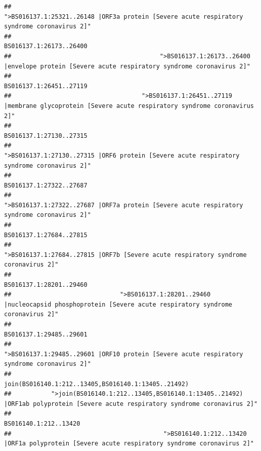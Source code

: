 \documentclass[
]{article}
\begin{document}
\begin{verbatim}
##                                            ">BS016137.1:25321..26148 |ORF3a protein [Severe acute respiratory syndrome coronavirus 2]" 
##                                                                                                                BS016137.1:26173..26400 
##                                         ">BS016137.1:26173..26400 |envelope protein [Severe acute respiratory syndrome coronavirus 2]" 
##                                                                                                                BS016137.1:26451..27119 
##                                    ">BS016137.1:26451..27119 |membrane glycoprotein [Severe acute respiratory syndrome coronavirus 2]" 
##                                                                                                                BS016137.1:27130..27315 
##                                             ">BS016137.1:27130..27315 |ORF6 protein [Severe acute respiratory syndrome coronavirus 2]" 
##                                                                                                                BS016137.1:27322..27687 
##                                            ">BS016137.1:27322..27687 |ORF7a protein [Severe acute respiratory syndrome coronavirus 2]" 
##                                                                                                                BS016137.1:27684..27815 
##                                                    ">BS016137.1:27684..27815 |ORF7b [Severe acute respiratory syndrome coronavirus 2]" 
##                                                                                                                BS016137.1:28201..29460 
##                              ">BS016137.1:28201..29460 |nucleocapsid phosphoprotein [Severe acute respiratory syndrome coronavirus 2]" 
##                                                                                                                BS016137.1:29485..29601 
##                                            ">BS016137.1:29485..29601 |ORF10 protein [Severe acute respiratory syndrome coronavirus 2]" 
##                                                                                    join(BS016140.1:212..13405,BS016140.1:13405..21492) 
##           ">join(BS016140.1:212..13405,BS016140.1:13405..21492) |ORF1ab polyprotein [Severe acute respiratory syndrome coronavirus 2]" 
##                                                                                                                  BS016140.1:212..13420 
##                                          ">BS016140.1:212..13420 |ORF1a polyprotein [Severe acute respiratory syndrome coronavirus 2]" 

\end{verbatim}
\end{document}

